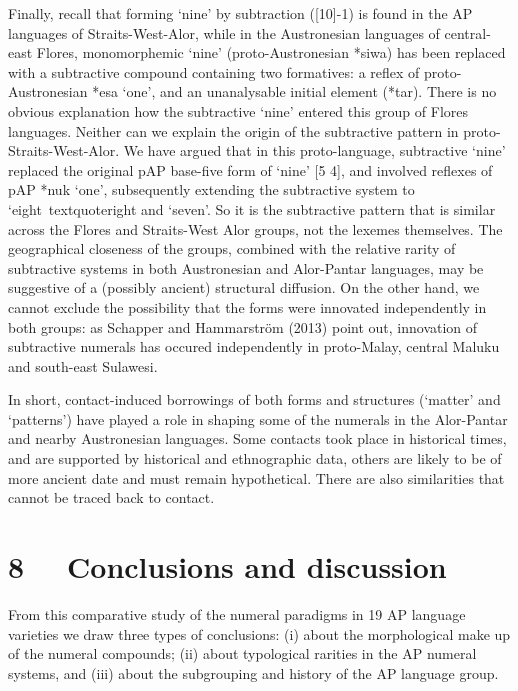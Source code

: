 Finally, recall that forming {\textquoteleft}nine{\textquoteright} by subtraction ([10]-1) is found in the AP languages of Straits-West-Alor, while in the Austronesian languages of central-east Flores, monomorphemic {\textquoteleft}nine{\textquoteright} (proto-Austronesian *siwa) has been replaced with a subtractive compound containing two formatives: a reflex of proto-Austronesian *esa {\textquoteleft}one{\textquoteright}, and an unanalysable initial element (*tar). There is no obvious explanation how the subtractive {\textquoteleft}nine{\textquoteright} entered this group of Flores languages. Neither can we explain the origin of the subtractive pattern in proto-Straits-West-Alor. We have argued that in this proto-language, subtractive {\textquoteleft}nine{\textquoteright} replaced the original pAP base-five form of {\textquoteleft}nine{\textquoteright} [5 4], and involved reflexes of pAP *nuk {\textquoteleft}one{\textquoteright}, subsequently extending the subtractive system to {\textquoteleft}eight{\
textquoteright} and {\textquoteleft}seven{\textquoteright}. So it is the subtractive pattern that is similar across the Flores and Straits-West Alor groups, not the lexemes themselves. The geographical closeness of the groups, combined with the relative rarity of subtractive systems in both Austronesian and Alor-Pantar languages, may be suggestive of a (possibly ancient) structural diffusion. On the other hand, we cannot exclude the possibility that the forms were innovated independently in both groups: as Schapper and Hammarstr\"om (2013) point out, innovation of subtractive numerals has occured independently in proto-Malay, central Maluku and south-east Sulawesi. 

In short, contact-induced borrowings of both forms and structures ({\textquoteleft}matter{\textquoteright} and {\textquoteleft}patterns{\textquoteright}) have played a role in shaping some of the numerals in the Alor-Pantar and nearby Austronesian languages. Some contacts took place in historical times, and are supported by historical and ethnographic data, others are likely to be of more ancient date and must remain hypothetical. There are also similarities that cannot be traced back to contact. 

\section[8 \ \ Conclusions and discussion]{8 \ \ Conclusions and discussion}
From this comparative study of the numeral paradigms in 19 AP language varieties we draw three types of conclusions: (i) about the morphological make up of the numeral compounds; (ii) about typological rarities in the AP numeral systems, and (iii) about the subgrouping and history of the AP language group.


